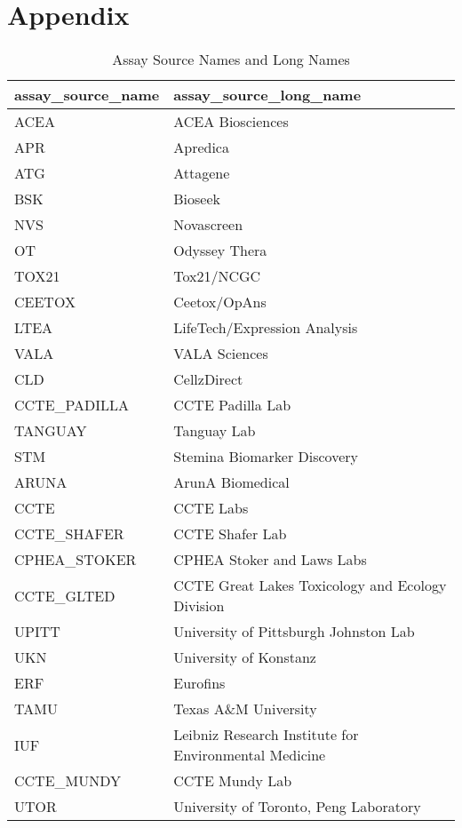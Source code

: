 \chapter{Appendix}

\begin{table}
    \begin{center}
    \caption{Assay Source Names and Long Names}
    \begin{tabular}{ll}
        \toprule
        assay\_source\_name & assay\_source\_long\_name \\
        \midrule
        ACEA & ACEA Biosciences \\
        APR & Apredica \\
        ATG & Attagene \\
        BSK & Bioseek \\
        NVS & Novascreen \\
        OT & Odyssey Thera \\
        TOX21 & Tox21/NCGC \\
        CEETOX & Ceetox/OpAns \\
        LTEA & LifeTech/Expression Analysis \\
        VALA & VALA Sciences \\
        CLD & CellzDirect \\
        CCTE\_PADILLA & CCTE Padilla Lab \\
        TANGUAY & Tanguay Lab \\
        STM & Stemina Biomarker Discovery \\
        ARUNA & ArunA Biomedical \\
        CCTE & CCTE Labs \\
        CCTE\_SHAFER & CCTE Shafer Lab \\
        CPHEA\_STOKER & CPHEA Stoker and Laws Labs \\
        CCTE\_GLTED & CCTE Great Lakes Toxicology and Ecology Division \\
        UPITT & University of Pittsburgh Johnston Lab \\
        UKN & University of Konstanz \\
        ERF & Eurofins \\
        TAMU & Texas A\&M University \\
        IUF & Leibniz Research Institute for Environmental Medicine \\
        CCTE\_MUNDY & CCTE Mundy Lab \\
        UTOR & University of Toronto, Peng Laboratory \\
        \bottomrule
    \end{tabular}
\end{center}
\end{table}


